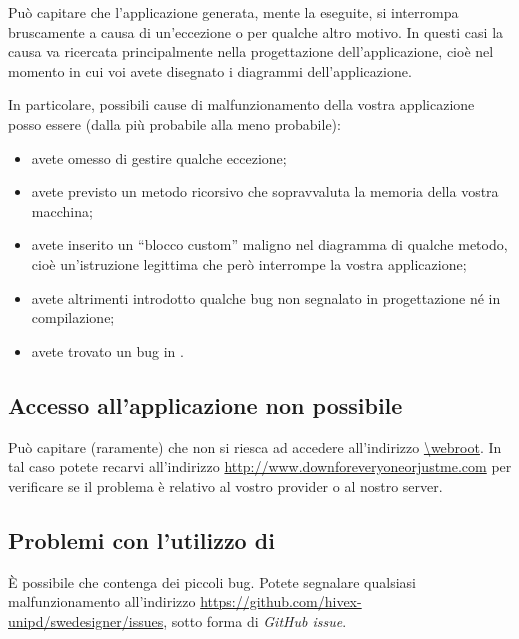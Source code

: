 Può capitare che l'applicazione generata, mente la eseguite, si interrompa bruscamente a causa di un'eccezione o per qualche altro motivo. In questi casi la causa va ricercata principalmente nella progettazione dell'applicazione, cioè nel momento in cui voi avete disegnato i diagrammi dell'applicazione.

In particolare, possibili cause di malfunzionamento della vostra applicazione posso essere (dalla più probabile alla meno probabile):
\begin{itemize}
	\item avete omesso di gestire qualche eccezione;
	\item avete previsto un metodo ricorsivo che sopravvaluta la memoria della vostra macchina;
	\item avete inserito un “blocco custom” maligno nel diagramma di qualche metodo, cioè un'istruzione legittima che però interrompe la vostra applicazione;
	\item avete altrimenti introdotto qualche bug non segnalato in progettazione né in compilazione;
	\item avete trovato un bug in \proj.
\end{itemize}



\subsection{Accesso all'applicazione non possibile}

Può capitare (raramente) che non si riesca ad accedere all'indirizzo \url{\webroot}. In tal caso potete recarvi all'indirizzo \url{http://www.downforeveryoneorjustme.com} per verificare se il problema è relativo al vostro provider o al nostro server.



\subsection{Problemi con l'utilizzo di \proj}

È possibile che \proj{} contenga dei piccoli bug. Potete segnalare qualsiasi malfunzionamento all'indirizzo \url{https://github.com/hivex-unipd/swedesigner/issues}, sotto forma di \emph{GitHub issue}.



